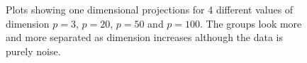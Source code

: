 \begin{figure}[hbtp]
       \caption{Plots showing one dimensional projections for 4 different values of dimension $p=3$, $p=20$, $p=50$ and $p=100$. The groups look more and more separated as dimension increases although the data is purely noise.  }
       \label{dist_1d}
\end{figure}

